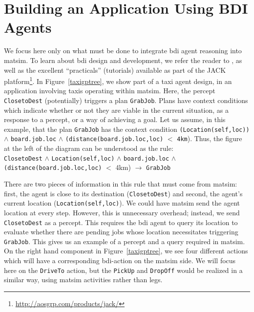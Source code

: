 \section{Building an Application Using BDI Agents}
\label{sec:bdi-usage}
We focus here only on what must be done to integrate  \gls{bdi} agent
reasoning into \gls{matsim}. To learn about \gls{bdi} design and development, we
refer the reader to \citet{prometheusbook}, as well as the excellent
``practicals'' (tutorials) available as part of the JACK
platform\footnote{\url{http://aosgrp.com/products/jack/}}. In Figure~\ref{taxigptree}, 
we show part of a  
taxi agent design, in an application involving taxis operating
within \gls{matsim}. Here, the percept \lstinline{ClosetoDest}
(potentially) triggers a plan \lstinline{GrabJob}. Plans have context
conditions which indicate whether or not they are viable in the
current situation, as a response to a percept, or a way of achieving a
goal. Let us assume, in this example, that the plan \lstinline{GrabJob} has
the context condition \lstinline{(Location(self,loc))} $\wedge$ \lstinline{board.job.loc} $\wedge$ \lstinline{(distance(board.job.loc,loc)} $<$
\lstinline{4km}). Thus, the figure at the left of the diagram can be understood as the rule: \\
\lstinline{ClosetoDest} $\wedge$ \lstinline{Location(self,loc)} $\wedge$ \lstinline{board.job.loc} $\wedge$ \lstinline{(distance(board.job.loc,loc)} $<$ 4km) $\rightarrow$ \lstinline{GrabJob} 

There are two pieces of information in this rule that must come from
\gls{matsim}: first, the agent is close to its
destination (\lstinline{ClosetoDest}) and second, the agent's
current location (\lstinline{Location(self,loc)}).  We could have \gls{matsim}
send the agent location at every step. However, this is unnecessary
overhead; instead, we send \lstinline{ClosetoDest} as a percept. 
This requires the \gls{bdi} agent to query its location to evaluate
whether there are pending jobs whose location necessitates triggering
 \lstinline{GrabJob}.  This gives us an
example of a percept and a query required in \gls{matsim}. On the right hand
component in Figure~\ref{taxigptree}, we see four different actions
which will have a corresponding \gls{bdi}-action on the \gls{matsim} side. We will
focus here on the \lstinline{DriveTo} action, but the \lstinline{PickUp} and
\lstinline{DropOff} would be realized in a similar way, using \gls{matsim}
activities rather than legs.

